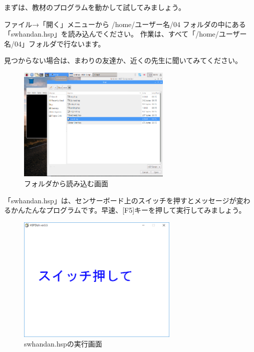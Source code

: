 まずは、教材のプログラムを動かして試してみましょう。

ファイル→「開く」メニューから /home/ユーザー名/04 フォルダの中にある「swhandan.hsp」を読み込んでください。
作業は、すべて「/home/ユーザー名/04」フォルダで行ないます。

見つからない場合は、まわりの友達か、近くの先生に聞いてみてください。


\begin{figure}[H]
    \begin{center}
      \includegraphics[keepaspectratio,width=7.338cm,height=5.493cm]{text04-img/text04-img002.png}
      \caption{フォルダから読み込む画面}
    \end{center}
    \label{fig:prog_menu}
\end{figure}


「swhandan.hsp」は、センサーボード上のスイッチを押すとメッセージが変わるかんたんなプログラムです。早速、[F5]キーを押して実行してみましょう。


\begin{figure}[H]
    \begin{center}
      \includegraphics[keepaspectratio,width=7.673cm,height=6.05cm]{text04-img/text04-img003.png}
      \caption{swhandan.hspの実行画面}
    \end{center}
    \label{fig:prog_menu}
\end{figure}


